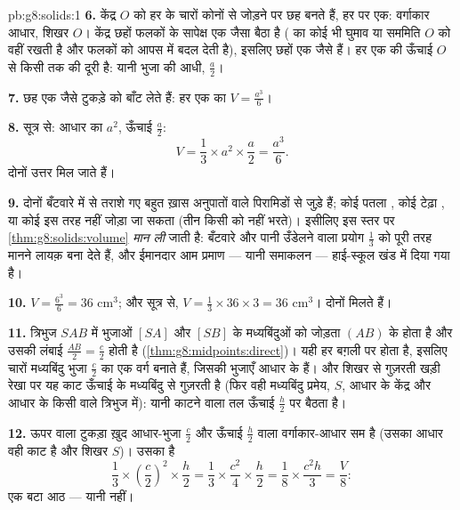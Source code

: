 \begin{solution}{pb:g8:solids:1}
\textbf{6.} केंद्र $O$ को हर  के चारों कोनों से जोड़ने पर छह
 बनते हैं, हर  पर एक: वर्गाकार आधार, शिखर $O$। केंद्र
छहों फलकों के सापेक्ष एक जैसा बैठा है ( का कोई भी घुमाव या सममिति
$O$ को वहीं रखती है और फलकों को आपस में बदल देती है), इसलिए छहों
 एक जैसे हैं। हर एक की ऊँचाई $O$ से किसी  तक की दूरी है:
यानी भुजा की आधी, $\frac{a}{2}$।

\textbf{7.} छह एक जैसे टुकड़े  को बाँट लेते हैं: हर एक का
$V = \frac{a^3}{6}$।

\textbf{8.} सूत्र से: आधार का  $a^2$, ऊँचाई $\frac a2$:
\[
V = \frac13 \times a^2 \times \frac{a}{2} = \frac{a^3}{6} .
\]
दोनों उत्तर मिल जाते हैं।

\textbf{9.} दोनों बँटवारे  में से तराशे गए बहुत ख़ास अनुपातों वाले
पिरामिडों से जुड़े हैं; कोई पतला , कोई टेढ़ा , या कोई
 इस तरह नहीं जोड़ा जा सकता (तीन  किसी  को नहीं भरते)।
इसीलिए इस स्तर पर \cref{thm:g8:solids:volume} \emph{मान ली} जाती
है: बँटवारे और पानी उँडेलने वाला प्रयोग $\frac13$ को पूरी तरह मानने
लायक़ बना देते हैं, और ईमानदार आम प्रमाण --- यानी समाकलन ---
हाई-स्कूल खंड में दिया गया है।

\textbf{10.} $V = \frac{6^3}{6} = 36$ cm$^3$; और सूत्र से,
$V = \frac13 \times 36 \times 3 = 36$ cm$^3$। दोनों मिलते हैं।

\textbf{11.} त्रिभुज $SAB$ में भुजाओं $[SA]$ और $[SB]$ के
मध्यबिंदुओं को जोड़ता  $(AB)$ के  होता है और उसकी लंबाई
$\frac{AB}{2} = \frac{c}{2}$ होती है
(\cref{thm:g8:midpoints:direct})। यही हर बग़ली  पर होता है,
इसलिए चारों मध्यबिंदु भुजा $\frac c2$ का एक वर्ग बनाते हैं, जिसकी
भुजाएँ आधार के  हैं। और शिखर से गुज़रती खड़ी रेखा पर यह काट
ऊँचाई के मध्यबिंदु से गुज़रती है (फिर वही मध्यबिंदु प्रमेय, $S$,
आधार के केंद्र और आधार के किसी  वाले त्रिभुज में): यानी काटने
वाला तल ऊँचाई $\frac h2$ पर बैठता है।

\textbf{12.} ऊपर वाला टुकड़ा ख़ुद आधार-भुजा $\frac c2$ और ऊँचाई
$\frac h2$ वाला वर्गाकार-आधार सम  है (उसका आधार वही काट है
और शिखर $S$)। उसका  है
\[
\frac13 \times \left(\frac c2\right)^2 \times \frac h2
= \frac13 \times \frac{c^2}{4} \times \frac h2
= \frac{1}{8} \times \frac{c^2 h}{3}
= \frac{V}{8} :
\]
एक बटा आठ --- यानी  नहीं।


\end{solution}
